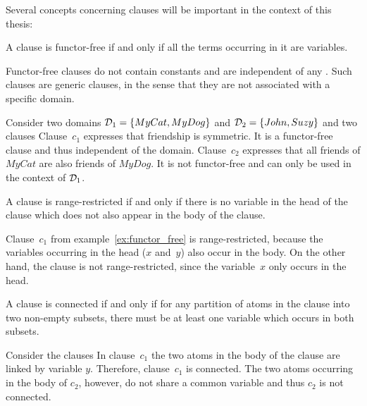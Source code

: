 Several concepts concerning clauses will be important in the context of this thesis:
\begin{definition}
\label{def:funtor_free}
A clause is functor-free if and only if all the terms occurring in it are variables.
\end{definition}
Functor-free clauses do not contain constants and are independent of any . Such clauses are generic clauses, in the sense that they are not associated with a specific domain.
\begin{example}
\label{ex:functor_free}
Consider two domains $\mathcal{D}_1 = \{MyCat, MyDog\}$ and $\mathcal{D}_2 = \{John, Suzy\}$ and two clauses 
Clause~$c_1$ expresses that friendship is symmetric. It is a functor-free clause and thus independent of the domain. Clause~$c_2$ expresses that all friends of $MyCat$ are also friends of $MyDog$. It is not functor-free and can only be used in the context of $\mathcal{D}_1$. 
\end{example}

\begin{definition}
\label{def:range_restricted}
A clause is range-restricted if and only if there is no variable in the head of the clause which does not also appear in the body of the clause.
\end{definition}

\begin{example}
Clause~$c_1$ from example~\ref{ex:functor_free} is range-restricted, because the variables occurring in the head ($x$ and~$y$) also occur in the body. On the other hand, the clause  is not range-restricted, since the variable~$x$ only occurs in the head.
\end{example}

\begin{definition}
\label{def:connected}
A clause is connected if and only if for any partition of atoms in the clause into two non-empty subsets, there must be at least one variable which occurs in both subsets.
\end{definition}

\begin{example}
Consider the clauses  In clause~$c_1$ the two atoms in the body of the clause are linked by variable $y$. Therefore, clause~$c_1$ is connected. The two atoms occurring in the body of $c_2$, however, do not share a common variable and thus $c_2$ is not connected.
\end{example}

